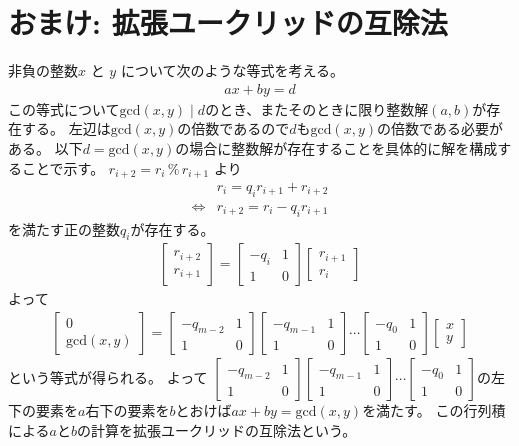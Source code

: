 \documentclass[a4paper,oneside,onecolumn,openany,article,10pt]{memoir}
\theoremstyle{remark}
\begin{document}
\section{おまけ: 拡張ユークリッドの互除法}
非負の整数$x$ と $y$ について次のような等式を考える。
\begin{align*}
a x + b y = d
\end{align*}
この等式について$\mathrm{gcd}(x,y) \mid d$のとき、またそのときに限り整数解$(a,b)$が存在する。
左辺は$\mathrm{gcd}(x,y)$の倍数であるので$d$も$\mathrm{gcd}(x,y)$の倍数である必要がある。
以下$d=\mathrm{gcd}(x,y)$の場合に整数解が存在することを具体的に解を構成することで示す。
$r_{i+2} = r_i \,\%\, r_{i+1}$ より
\begin{align*}
&r_i = q_i r_{i+1} + r_{i+2}\\
\iff&r_{i+2} = r_i - q_i r_{i+1}
\end{align*}
を満たす正の整数$q_i$が存在する。
\begin{align*}
\begin{bmatrix}
r_{i+2}\\
r_{i+1}
\end{bmatrix}
=
\begin{bmatrix}
-q_i&1\\
1&0
\end{bmatrix}
\begin{bmatrix}
r_{i+1}\\
r_{i}
\end{bmatrix}
\end{align*}
よって
\begin{align*}
\begin{bmatrix}
0\\
\mathrm{gcd}(x,y)
\end{bmatrix}
=
\begin{bmatrix}
-q_{m-2}&1\\
1&0
\end{bmatrix}
\begin{bmatrix}
-q_{m-1}&1\\
1&0
\end{bmatrix}
\dotsm
\begin{bmatrix}
-q_0&1\\
1&0
\end{bmatrix}
\begin{bmatrix}
x\\
y
\end{bmatrix}
\end{align*}
という等式が得られる。
よって
$
\begin{bmatrix}
-q_{m-2}&1\\
1&0
\end{bmatrix}
\begin{bmatrix}
-q_{m-1}&1\\
1&0
\end{bmatrix}
\dotsm
\begin{bmatrix}
-q_0&1\\
1&0
\end{bmatrix}
$の左下の要素を$a$右下の要素を$b$とおけば$ax+by=\mathrm{gcd}(x,y)$を満たす。
この行列積による$a$と$b$の計算を拡張ユークリッドの互除法という。
\end{document}
